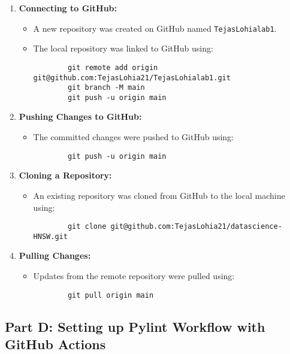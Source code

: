 \documentclass[12pt, a4paper]{report}
\begin{document}
\begin{enumerate}
    \item \textbf{Connecting to GitHub:}
    \begin{itemize}
        \item A new repository was created on GitHub named \texttt{TejasLohialab1}.
        \item The local repository was linked to GitHub using:
        \begin{verbatim}
        git remote add origin git@github.com:TejasLohia21/TejasLohialab1.git
        git branch -M main
        git push -u origin main
        \end{verbatim}
    \end{itemize}

    \item \textbf{Pushing Changes to GitHub:}
    \begin{itemize}
        \item The committed changes were pushed to GitHub using:
        \begin{verbatim}
        git push -u origin main
        \end{verbatim}
    \end{itemize}

    \item \textbf{Cloning a Repository:}
    \begin{itemize}
        \item An existing repository was cloned from GitHub to the local machine using:
        \begin{verbatim}
        git clone git@github.com:TejasLohia21/datascience-HNSW.git
        \end{verbatim}
    \end{itemize}

    \item \textbf{Pulling Changes:}
    \begin{itemize}
        \item Updates from the remote repository were pulled using:
        \begin{verbatim}
        git pull origin main
        \end{verbatim}
    \end{itemize}
\end{enumerate}

\subsection*{Part D: Setting up Pylint Workflow with GitHub Actions}
\end{document}
